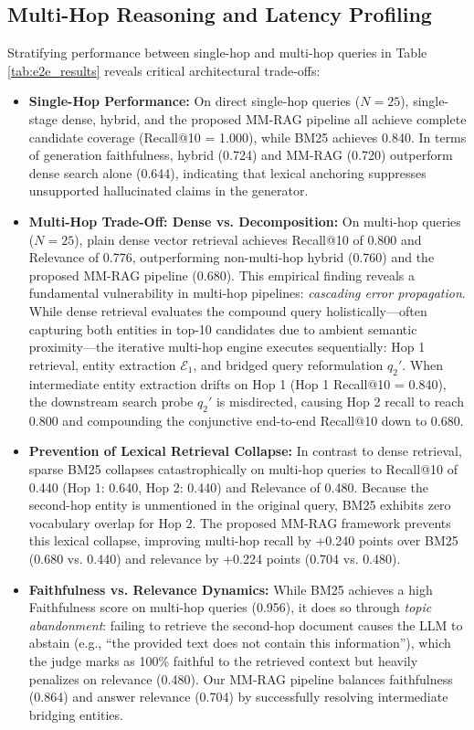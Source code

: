 \documentclass[conference]{IEEEtran}
\begin{document}
\subsection{Multi-Hop Reasoning and Latency Profiling}
Stratifying performance between single-hop and multi-hop queries in Table \ref{tab:e2e_results} reveals critical architectural trade-offs:
\begin{itemize}
    \item \textbf{Single-Hop Performance:} On direct single-hop queries ($N=25$), single-stage dense, hybrid, and the proposed MM-RAG pipeline all achieve complete candidate coverage (Recall@10 = 1.000), while BM25 achieves 0.840. In terms of generation faithfulness, hybrid (0.724) and MM-RAG (0.720) outperform dense search alone (0.644), indicating that lexical anchoring suppresses unsupported hallucinated claims in the generator.
    \item \textbf{Multi-Hop Trade-Off: Dense vs. Decomposition:} On multi-hop queries ($N=25$), plain dense vector retrieval achieves Recall@10 of 0.800 and Relevance of 0.776, outperforming non-multi-hop hybrid (0.760) and the proposed MM-RAG pipeline (0.680). This empirical finding reveals a fundamental vulnerability in multi-hop pipelines: \textit{cascading error propagation}. While dense retrieval evaluates the compound query holistically—often capturing both entities in top-10 candidates due to ambient semantic proximity—the iterative multi-hop engine executes sequentially: Hop 1 retrieval, entity extraction $\mathcal{E}_1$, and bridged query reformulation $q_2'$. When intermediate entity extraction drifts on Hop 1 (Hop 1 Recall@10 = 0.840), the downstream search probe $q_2'$ is misdirected, causing Hop 2 recall to reach 0.800 and compounding the conjunctive end-to-end Recall@10 down to 0.680.
    \item \textbf{Prevention of Lexical Retrieval Collapse:} In contrast to dense retrieval, sparse BM25 collapses catastrophically on multi-hop queries to Recall@10 of 0.440 (Hop 1: 0.640, Hop 2: 0.440) and Relevance of 0.480. Because the second-hop entity is unmentioned in the original query, BM25 exhibits zero vocabulary overlap for Hop 2. The proposed MM-RAG framework prevents this lexical collapse, improving multi-hop recall by +0.240 points over BM25 (0.680 vs. 0.440) and relevance by +0.224 points (0.704 vs. 0.480).
    \item \textbf{Faithfulness vs. Relevance Dynamics:} While BM25 achieves a high Faithfulness score on multi-hop queries (0.956), it does so through \textit{topic abandonment}: failing to retrieve the second-hop document causes the LLM to abstain (e.g., ``the provided text does not contain this information''), which the judge marks as 100\% faithful to the retrieved context but heavily penalizes on relevance (0.480). Our MM-RAG pipeline balances faithfulness (0.864) and answer relevance (0.704) by successfully resolving intermediate bridging entities.

\end{itemize}
\end{document}
